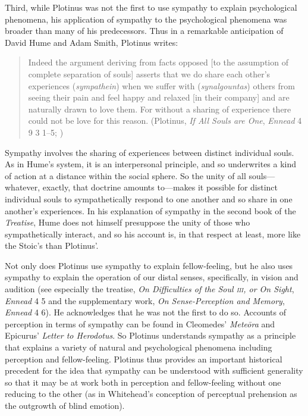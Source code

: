 Third, while Plotinus was not the first to use sympathy to explain psychological phenomena, his application of sympathy to the psychological phenomena was broader than many of his predecessors. Thus in a remarkable anticipation of David Hume and Adam Smith, Plotinus writes:
\begin{quote}
	Indeed the argument deriving from facts opposed [to the assumption of complete separation of souls] asserts that we do share each other's experiences (\emph{sympathein}) when we suffer with (\emph{synalgountas}) others from seeing their pain and feel happy and relaxed [in their company] and are naturally drawn to love them. For without a sharing of experience there could not be love for this reason. (Plotinus, \emph{If All Souls are One}, \emph{Ennead} 4 9 3 1--5; \citealt[433--5]{Armstrong:1984aa})
\end{quote}
Sympathy involves the sharing of experiences between distinct individual souls. As in Hume's system, it is an interpersonal principle, and so underwrites a kind of action at a distance within the social sphere. So the unity of all souls---whatever, exactly, that doctrine amounts to---makes it possible for distinct individual souls to sympathetically respond to one another and so share in one another's experiences. In his explanation of sympathy in the second book of the \emph{Treatise}, Hume does not himself presuppose the unity of those who sympathetically interact, and so his account is, in that respect at least, more like the Stoic's than Plotinus'.

Not only does Plotinus use sympathy to explain fellow-feeling, but he also uses sympathy to explain the operation of our distal senses, specifically, in vision and audition (see especially the treatise, \emph{On Difficulties of the Soul \textsc{iii}, or On Sight}, \emph{Ennead} 4 5 and the supplementary work, \emph{On Sense-Perception and Memory}, \emph{Ennead} 4 6). He acknowledges that he was not the first to do so. Accounts of perception in terms of sympathy can be found in Cleomedes' \emph{Meteōra} and Epicurus' \emph{Letter to Herodotus}. So Plotinus understands sympathy as a principle that explains a variety of natural and psychological phenomena including perception and fellow-feeling. Plotinus thus provides an important historical precedent for the idea that sympathy can be understood with sufficient generality so that it may be at work both in perception and fellow-feeling without one reducing to the other (as in Whitehead's \citeyear{Whitehead:1978zr} conception of perceptual prehension as the outgrowth of blind emotion).

